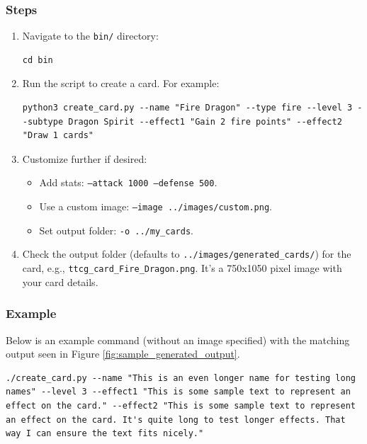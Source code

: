 \subsubsection{Steps}
\begin{enumerate}
	\item Navigate to the \texttt{bin/} directory:
\begin{lstlisting}[style=terminalstyle]
cd bin
\end{lstlisting}
	\item Run the script to create a card. For example:
\begin{lstlisting}[style=terminalstyle]
python3 create_card.py --name "Fire Dragon" --type fire --level 3 --subtype Dragon Spirit --effect1 "Gain 2 fire points" --effect2 "Draw 1 cards"
\end{lstlisting}
	\item Customize further if desired:
	\begin{itemize}
		\item Add stats: \texttt{--attack 1000 --defense 500}.
		\item Use a custom image: \texttt{--image ../images/custom.png}.
		\item Set output folder: \texttt{-o ../my\_cards}.
	\end{itemize}
	\item Check the output folder (defaults to \texttt{../images/generated\_cards/}) for the card, e.g., \texttt{ttcg\_card\_Fire\_Dragon.png}. It’s a 750x1050 pixel image with your card details.
\end{enumerate}

\subsubsection{Example}
Below is an example command (without an image specified) with the matching output seen in Figure \ref{fig:sample_generated_output}.
\begin{lstlisting}[style=terminalstyle]
./create_card.py --name "This is an even longer name for testing long names" --level 3 --effect1 "This is some sample text to represent an effect on the card." --effect2 "This is some sample text to represent an effect on the card. It's quite long to test longer effects. That way I can ensure the text fits nicely."
\end{lstlisting}

